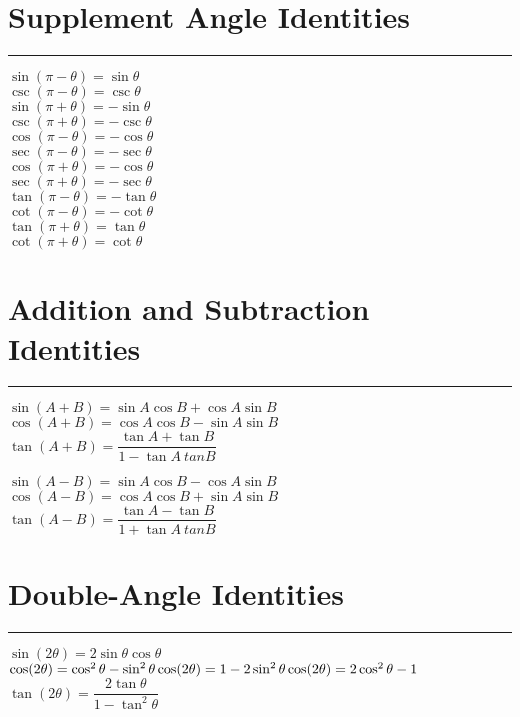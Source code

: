 \documentclass{article}
\begin{document}
\section{Supplement Angle Identities}
\hrule
\begin{multicols}{3}
    \noindent
    $\sin(\pi - \theta) = \sin \theta$ \\
    $\csc(\pi - \theta) = \csc \theta$ \\
    $\sin(\pi + \theta) = -\sin \theta$ \\
    $\csc(\pi + \theta) = -\csc \theta$ \\
    $\cos(\pi - \theta) = -\cos \theta$ \\
    $\sec(\pi - \theta) = -\sec \theta$ \\
    $\cos(\pi + \theta) = -\cos \theta$ \\
    $\sec(\pi + \theta) = -\sec \theta$ \\
    $\tan(\pi - \theta) = -\tan \theta$ \\
    $\cot(\pi - \theta) = -\cot \theta$ \\
    $\tan(\pi + \theta) = \tan \theta$ \\
    $\cot(\pi + \theta) = \cot \theta$ 
\end{multicols}

\section{Addition and Subtraction Identities}
\hrule
\begin{multicols}{2}
    \noindent
    $\sin(A + B) = \sin A \cos B + \cos A \sin B$ \\
    $\cos(A + B) = \cos A \cos B - \sin A \sin B$ \\
    $\tan(A + B) = \dfrac{\tan A + \tan B}{1- \tan A \ tan B}$\\
\end{multicols}
\begin{multicols}{2}
    \noindent
    $\sin(A - B) = \sin A \cos B - \cos A \sin B$ \\
    $\cos(A - B) = \cos A \cos B + \sin A \sin B$ \\
    $\tan(A - B) = \dfrac{\tan A - \tan B}{1 + \tan A \ tan B}$\\
\end{multicols}

\section{Double-Angle Identities}
\hrule
\begin{multicols}{3}
    \noindent
    $\sin(2\theta) = 2\sin\theta\cos\theta$ \\
    $\cos(2\theta) = \cos^2\theta-\sin^2\theta\\
    \cos(2\theta) = 1-2\sin^2\theta \\
    \cos(2\theta) = 2\cos^2\theta - 1$ \\
    $\tan(2\theta) = \dfrac{2\tan\theta}{1-\tan^2\theta}$
\end{multicols}
\end{document}
